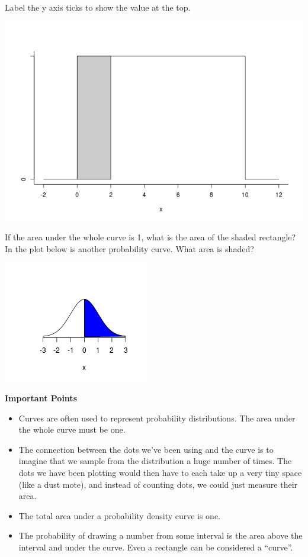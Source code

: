 Label the y axis ticks to show the value at the top. 

\includegraphics[width=.6\linewidth]{plots/uniformDensity0-10.png}


If the area under the whole curve is 1, what is the area of the shaded rectangle?\\

In the plot below is another probability curve. What area is shaded?

\includegraphics[width=.4\linewidth]{../plots/halfNormal.png}


\begin{center}
  {\large\bf Important Points}
\end{center}

\begin{itemize}
\item Curves are often used to represent probability
  distributions. The area under the whole curve must be one.
\item The connection between the dots we've been using and the curve
  is to imagine that we sample from the distribution a huge
  number of times. The dots we have been plotting would then have to
  each take up a very tiny space (like a dust mote), and instead of
  counting dots, we could just measure their area.
\item The total area under a probability density curve is one.
\item The probability of drawing a number from some interval is the
  area above the interval and under the curve.  Even a rectangle can
  be considered a ``curve''.
\end{itemize}
